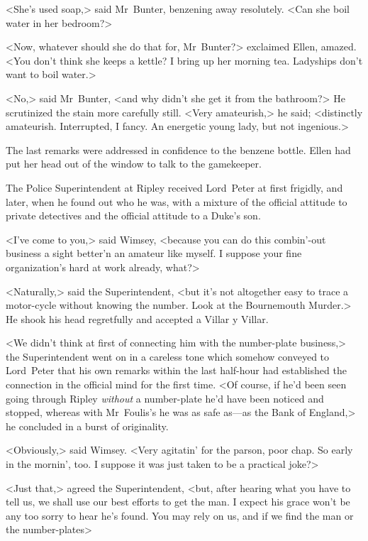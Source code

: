 <She's used soap,> said Mr~Bunter, benzening away resolutely. <Can she boil water in her bedroom?>

<Now, whatever should she do that for, Mr~Bunter?> exclaimed Ellen, amazed. <You don't think she keeps a kettle? I bring up her morning tea. Ladyships don't want to boil water.>

<No,> said Mr~Bunter, <and why didn't she get it from the bathroom?> He scrutinized the stain more carefully still. <Very amateurish,> he said; <distinctly amateurish. Interrupted, I fancy. An energetic young lady, but not ingenious.>

The last remarks were addressed in confidence to the benzene bottle.  Ellen had put her head out of the window to talk to the gamekeeper.

\divider

The Police Superintendent at Ripley received Lord~Peter at first frigidly, and later, when he found out who he was, with a mixture of the official attitude to private detectives and the official attitude to a Duke's son.

<I've come to you,> said Wimsey, <because you can do this combin'-out business a sight better'n an amateur like myself. I suppose your fine organization's hard at work already, what?>

<Naturally,> said the Superintendent, <but it's not altogether easy to trace a motor-cycle without knowing the number. Look at the Bournemouth Murder.> He shook his head regretfully and accepted a Villar y Villar.

<We didn't think at first of connecting him with the number-plate business,> the Superintendent went on in a careless tone which somehow conveyed to Lord~Peter that his own remarks within the last half-hour had established the connection in the official mind for the first time. <Of course, if he'd been seen going through Ripley \emph{without} a number-plate he'd have been noticed and stopped, whereas with Mr~Foulis's he was as safe as—as the Bank of England,> he concluded in a burst of originality.

<Obviously,> said Wimsey. <Very agitatin' for the parson, poor chap.  So early in the mornin', too. I suppose it was just taken to be a practical joke?>

<Just that,> agreed the Superintendent, <but, after hearing what you have to tell us, we shall use our best efforts to get the man. I expect his grace won't be any too sorry to hear he's found. You may rely on us, and if we find the man or the number-plates\longdash>

